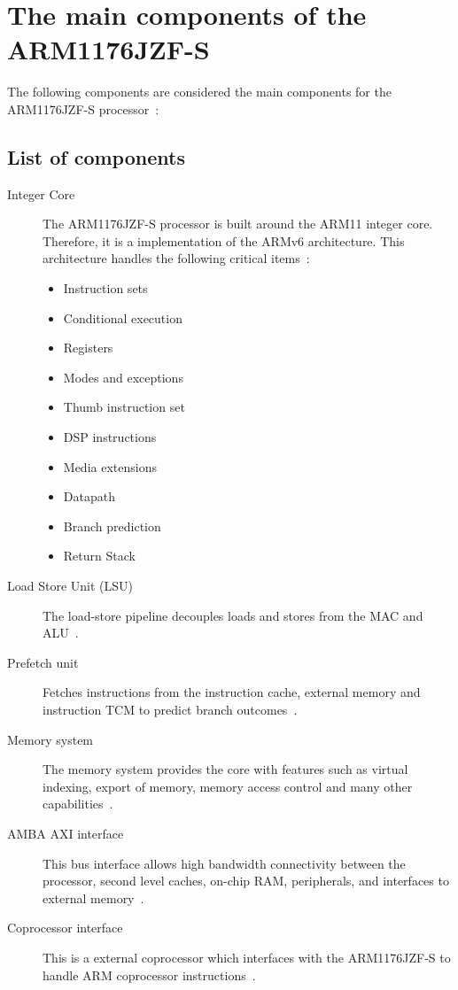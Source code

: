\documentclass[11pt]{report}
\begin{document}
\section{The main components of the ARM1176JZF-S}
\begin{onehalfspace}
The following components are considered the main components for the ARM1176JZF-S processor~\citep[1-8]{arm1176jzf-s}:
\subsection{List of components}
\end{onehalfspace}
\begin{description}
\item[Integer Core] The ARM1176JZF-S processor is built around the ARM11 integer core. Therefore, it is a implementation of the ARMv6 architecture. This architecture handles the following critical items~\citep[1-9]{arm1176jzf-s}:
\begin{itemize}
\item Instruction sets
\item Conditional execution
\item Registers
\item Modes and exceptions
\item Thumb instruction set
\item DSP instructions
\item Media extensions
\item Datapath
\item Branch prediction
\item Return Stack
\end{itemize}
\item[Load Store Unit (LSU)] The load-store pipeline decouples loads and stores from the MAC and ALU~\citep[1-11]{arm1176jzf-s}.
\item [Prefetch unit] Fetches instructions from the instruction cache, external memory and instruction TCM to predict branch outcomes~\citep[1-11]{arm1176jzf-s}.
\item [Memory system] The memory system provides the core with features such as virtual indexing, export of memory, memory access control and many other capabilities~\citep[1-12]{arm1176jzf-s}.
\item [AMBA AXI interface] This bus interface allows high bandwidth connectivity between the processor, second level caches, on-chip RAM, peripherals, and interfaces to external memory~\citep[1-16]{arm1176jzf-s}. 
\item [Coprocessor interface] This is a external coprocessor which interfaces with the ARM1176JZF-S to handle ARM coprocessor instructions~\citep[1-17]{arm1176jzf-s}.

\end{description}
\end{document}
